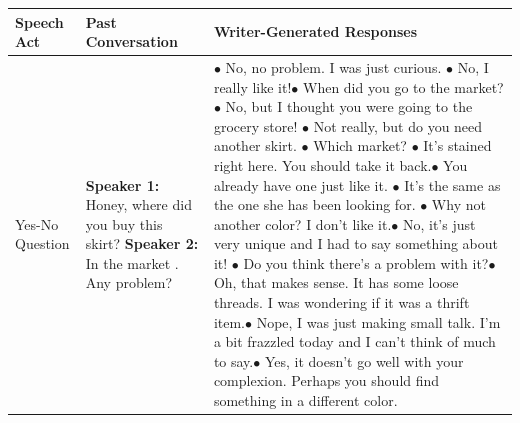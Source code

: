 \documentclass[11pt]{article}
\begin{document}
\begin{longtable}{|p{2cm}|p{3cm}|p{10cm}|}
 \hline\textbf{Speech Act} & \textbf{Past Conversation} & \textbf{Writer-Generated Responses}\\\hline
 Yes-No Question &  \textbf{Speaker 1:} Honey, where did you buy this skirt? \newline \hspace*{0.5cm} \textbf{Speaker 2:} In the market . Any problem? & $\bullet$ No, no problem. I was just curious. \newline $\bullet$ No, I really like it!\newline $\bullet$ When did you go to the market?	\newline $\bullet$ No, but I thought you were going to the grocery store!	\newline $\bullet$ Not really, but do you need another skirt. \newline \newline $\bullet$ Which market?	\newline $\bullet$ It's stained right here. You should take it back.\newline $\bullet$ You already have one just like it. \newline $\bullet$ It's the same as the one she has been looking for.	\newline $\bullet$ Why not another color? I don't like it.\newline\newline $\bullet$ No, it's just very unique and I had to say something about it!	\newline $\bullet$ Do you think there's a problem with it?\newline $\bullet$ Oh, that makes sense. It has some loose threads. I was wondering if it was a thrift item.\newline $\bullet$ Nope, I was just making small talk. I'm a bit frazzled today and I can't think of much to say.\newline $\bullet$ Yes, it doesn't go well with your complexion. Perhaps you should find something in a different color.\\\hline

\end{longtable}
\end{document}

